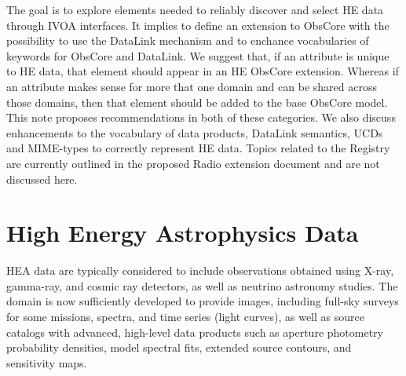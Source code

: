 \documentclass[11pt,a4paper]{ivoa}
\begin{document}
The goal is to explore elements needed to reliably discover and select \gls{HE} data through \gls{IVOA} interfaces. It implies to define an extension to ObsCore with the possibility to use the DataLink mechanism and to enchance vocabularies of keywords for ObsCore and DataLink. We suggest that, if an attribute is unique to \gls{HE} data, that element should appear in an \gls{HE} ObsCore extension. Whereas if an attribute makes sense for more that one domain and can be shared across those domains, then that element should be added to the base ObsCore model. This note proposes recommendations in both of these categories. We also discuss enhancements to the vocabulary of data products, DataLink semantics, UCDs and MIME-types to correctly represent \gls{HE} data. Topics related to the Registry are currently outlined in the proposed Radio extension document and are not discussed here.


\section{High Energy Astrophysics Data}

HEA data are typically considered to include observations obtained using X-ray, gamma-ray, and cosmic ray detectors, as well as neutrino astronomy studies. The domain is now sufficiently developed to provide images, including full-sky surveys for some missions, spectra, and time series (light curves), as well as source catalogs with advanced, high-level data products such as aperture photometry probability densities, model spectral fits, extended source contours, and sensitivity maps.
\end{document}
